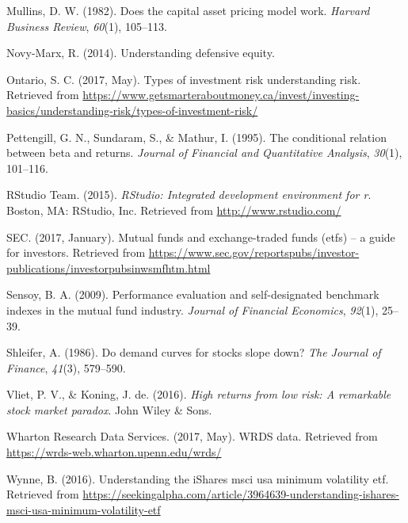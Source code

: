 \documentclass[12pt,twoside]{reedthesis}
\theoremstyle{definition}
\theoremstyle{definition}
\theoremstyle{definition}
\theoremstyle{remark}
\begin{document}
\hypertarget{ref-mullins1982}{}
Mullins, D. W. (1982). Does the capital asset pricing model work.
\emph{Harvard Business Review}, \emph{60}(1), 105--113.

\hypertarget{ref-novy2014}{}
Novy-Marx, R. (2014). Understanding defensive equity.

\hypertarget{ref-ontario2017}{}
Ontario, S. C. (2017, May). Types of investment risk \textbar{}
understanding risk. Retrieved from
\url{https://www.getsmarteraboutmoney.ca/invest/investing-basics/understanding-risk/types-of-investment-risk/}

\hypertarget{ref-pettengill1995}{}
Pettengill, G. N., Sundaram, S., \& Mathur, I. (1995). The conditional
relation between beta and returns. \emph{Journal of Financial and
Quantitative Analysis}, \emph{30}(1), 101--116.

\hypertarget{ref-rstudio2017}{}
RStudio Team. (2015). \emph{RStudio: Integrated development environment
for r}. Boston, MA: RStudio, Inc. Retrieved from
\url{http://www.rstudio.com/}

\hypertarget{ref-sec2017}{}
SEC. (2017, January). Mutual funds and exchange-traded funds (etfs) -- a
guide for investors. Retrieved from
\url{https://www.sec.gov/reportspubs/investor-publications/investorpubsinwsmfhtm.html}

\hypertarget{ref-sensoy2009}{}
Sensoy, B. A. (2009). Performance evaluation and self-designated
benchmark indexes in the mutual fund industry. \emph{Journal of
Financial Economics}, \emph{92}(1), 25--39.

\hypertarget{ref-shleifer1986}{}
Shleifer, A. (1986). Do demand curves for stocks slope down? \emph{The
Journal of Finance}, \emph{41}(3), 579--590.

\hypertarget{ref-van2016}{}
Vliet, P. V., \& Koning, J. de. (2016). \emph{High returns from low
risk: A remarkable stock market paradox}. John Wiley \& Sons.

\hypertarget{ref-wrds2017}{}
Wharton Research Data Services. (2017, May). WRDS data. Retrieved from
\url{https://wrds-web.wharton.upenn.edu/wrds/}

\hypertarget{ref-wynne2016}{}
Wynne, B. (2016). Understanding the iShares msci usa minimum volatility
etf. Retrieved from
\url{https://seekingalpha.com/article/3964639-understanding-ishares-msci-usa-minimum-volatility-etf}


\end{document}
